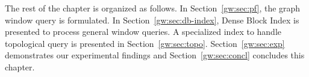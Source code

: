 The rest of the chapter is organized as follows. In Section~\ref{gw:sec:pf}, the graph window query is formulated.
In Section~\ref{gw:sec:db-index}, Dense Block Index is presented to process general window queries. A specialized
index to handle topological query is presented in Section~\ref{gw:sec:topo}. Section~\ref{gw:sec:exp} demonstrates our experimental
findings and Section~\ref{gw:sec:concl} concludes this chapter. 
